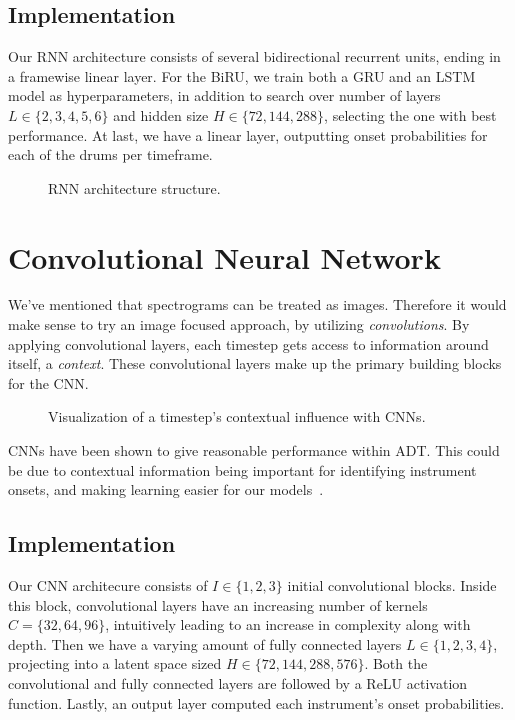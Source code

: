 \subsection{Implementation}

Our \gls{RNN} architecture consists of several bidirectional recurrent units, ending in a framewise linear layer. For the \gls{BiRU}, we train both a \gls{GRU} and an \gls{LSTM} model as hyperparameters, in addition to search over number of layers $L \in \{2, 3, 4, 5, 6\}$ and hidden size $H \in \{72, 144, 288\}$, selecting the one with best performance. At last, we have a linear layer, outputting onset probabilities for each of the drums per timeframe.

\begin{figure}[H]
    \centering
    
    \caption{RNN architecture structure.}
    \label{RNNFigure}
\end{figure}

\section{Convolutional Neural Network}

We've mentioned that spectrograms can be treated as images. Therefore it would make sense to try an image focused approach, by utilizing \textit{convolutions}. By applying convolutional layers, each timestep gets access to information around itself, a \textit{context}. These convolutional layers make up the primary building blocks for the \gls{CNN}.

\begin{figure}[H]
    \centering
    
    \caption{Visualization of a timestep's contextual influence with CNNs.}
    \label{CNNInfluenceFigure}
\end{figure}

\gls{CNN}s have been shown to give reasonable performance within \gls{ADT}. This could be due to contextual information being important for identifying instrument onsets, and making learning easier for our models~\cite{Vogl2017DrumTV}.

\subsection{Implementation}

Our \gls{CNN} architecure consists of $I \in \{1, 2, 3\}$ initial convolutional blocks. Inside this block, convolutional layers have an increasing number of kernels $C = \{32, 64, 96\}$, intuitively leading to an increase in complexity along with depth. Then we have a varying amount of fully connected layers $L \in \{1, 2, 3, 4\}$, projecting into a latent space sized $H \in \{72, 144, 288, 576\}$. Both the convolutional and fully connected layers are followed by a \gls{ReLU} activation function. Lastly, an output layer computed each instrument's onset probabilities.

